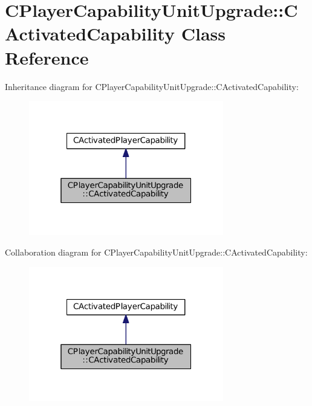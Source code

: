 \hypertarget{classCPlayerCapabilityUnitUpgrade_1_1CActivatedCapability}{}\section{C\+Player\+Capability\+Unit\+Upgrade\+:\+:C\+Activated\+Capability Class Reference}
\label{classCPlayerCapabilityUnitUpgrade_1_1CActivatedCapability}


Inheritance diagram for C\+Player\+Capability\+Unit\+Upgrade\+:\+:C\+Activated\+Capability\+:
\nopagebreak
\begin{figure}[H]
\begin{center}
\leavevmode
\includegraphics[width=241pt]{classCPlayerCapabilityUnitUpgrade_1_1CActivatedCapability__inherit__graph}
\end{center}
\end{figure}


Collaboration diagram for C\+Player\+Capability\+Unit\+Upgrade\+:\+:C\+Activated\+Capability\+:
\nopagebreak
\begin{figure}[H]
\begin{center}
\leavevmode
\includegraphics[width=241pt]{classCPlayerCapabilityUnitUpgrade_1_1CActivatedCapability__coll__graph}
\end{center}
\end{figure}

